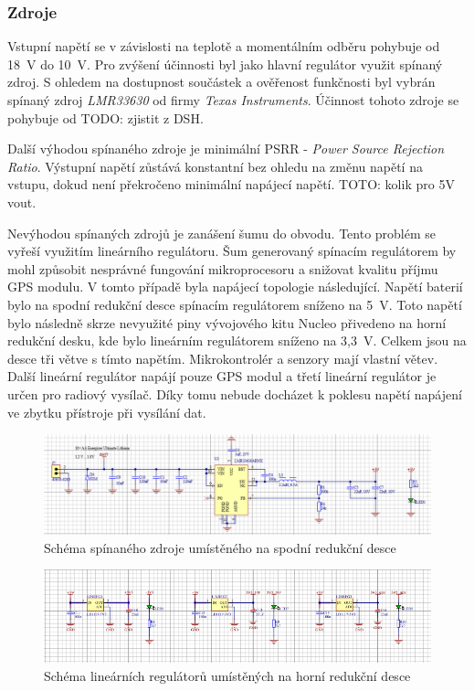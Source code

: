 \documentclass[twoside]{ctuthesis}
\theoremstyle{plain}
\theoremstyle{definition}
\theoremstyle{note}
\begin{document}
		\subsubsection{Zdroje}
		Vstupní napětí se v závislosti na teplotě a momentálním odběru pohybuje od 18~V do 10~V. Pro zvýšení účinnosti byl jako hlavní regulátor využit spínaný zdroj. S ohledem na dostupnost součástek a ověřenost funkčnosti byl vybrán spínaný zdroj \textit{LMR33630} od firmy \textit{Texas Instruments}. Účinnost tohoto zdroje se pohybuje od TODO: zjistit z DSH. 

		Další výhodou spínaného zdroje je minimální PSRR - \textit{Power Source Rejection Ratio}. Výstupní napětí zůstává konstantní bez ohledu na změnu napětí na vstupu, dokud není překročeno minimální napájecí napětí. TOTO: kolik pro 5V vout. 
		
		Nevýhodou spínaných zdrojů je zanášení šumu do obvodu. Tento problém se vyřeší využitím lineárního regulátoru. Šum generovaný spínacím regulátorem by mohl způsobit nesprávné fungování mikroprocesoru a snižovat kvalitu příjmu GPS modulu. V tomto případě byla napájecí topologie následující. Napětí baterií bylo na spodní redukční desce spínacím regulátorem sníženo na 5~V. Toto napětí bylo následně skrze nevyužité piny vývojového kitu Nucleo přivedeno na horní redukční desku, kde bylo lineárním regulátorem sníženo na 3,3~V. Celkem jsou na desce tři větve s tímto napětím. Mikrokontrolér a senzory mají vlastní větev. Další lineární regulátor napájí pouze GPS modul a třetí lineární regulátor je určen pro radiový vysílač. Díky tomu nebude docházet k poklesu napětí napájení ve zbytku přístroje při vysílání dat. 

		\begin{figure}
			\centering
			\includegraphics[width = \textwidth]{Figures/psu_bot.png}
			\caption{Schéma spínaného zdroje umístěného na spodní redukční desce}
			\label{fig:psu:bot}
		\end{figure}
		\begin{figure}
			\centering
			\includegraphics[width = \textwidth]{Figures/psu_top.png}
			\caption{Schéma lineárních regulátorů umístěných na horní redukční desce}
			\label{fig:psu:top}
		\end{figure}
\end{document}

